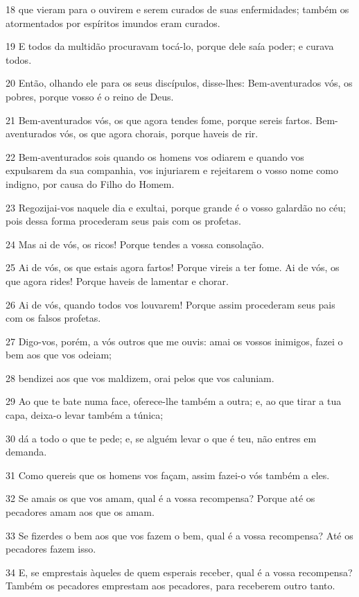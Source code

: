 \par 18 que vieram para o ouvirem e serem curados de suas enfermidades; também os atormentados por espíritos imundos eram curados.
\par 19 E todos da multidão procuravam tocá-lo, porque dele saía poder; e curava todos.
\par 20 Então, olhando ele para os seus discípulos, disse-lhes: Bem-aventurados vós, os pobres, porque vosso é o reino de Deus.
\par 21 Bem-aventurados vós, os que agora tendes fome, porque sereis fartos. Bem-aventurados vós, os que agora chorais, porque haveis de rir.
\par 22 Bem-aventurados sois quando os homens vos odiarem e quando vos expulsarem da sua companhia, vos injuriarem e rejeitarem o vosso nome como indigno, por causa do Filho do Homem.
\par 23 Regozijai-vos naquele dia e exultai, porque grande é o vosso galardão no céu; pois dessa forma procederam seus pais com os profetas.
\par 24 Mas ai de vós, os ricos! Porque tendes a vossa consolação.
\par 25 Ai de vós, os que estais agora fartos! Porque vireis a ter fome. Ai de vós, os que agora rides! Porque haveis de lamentar e chorar.
\par 26 Ai de vós, quando todos vos louvarem! Porque assim procederam seus pais com os falsos profetas.
\par 27 Digo-vos, porém, a vós outros que me ouvis: amai os vossos inimigos, fazei o bem aos que vos odeiam;
\par 28 bendizei aos que vos maldizem, orai pelos que vos caluniam.
\par 29 Ao que te bate numa face, oferece-lhe também a outra; e, ao que tirar a tua capa, deixa-o levar também a túnica;
\par 30 dá a todo o que te pede; e, se alguém levar o que é teu, não entres em demanda.
\par 31 Como quereis que os homens vos façam, assim fazei-o vós também a eles.
\par 32 Se amais os que vos amam, qual é a vossa recompensa? Porque até os pecadores amam aos que os amam.
\par 33 Se fizerdes o bem aos que vos fazem o bem, qual é a vossa recompensa? Até os pecadores fazem isso.
\par 34 E, se emprestais àqueles de quem esperais receber, qual é a vossa recompensa? Também os pecadores emprestam aos pecadores, para receberem outro tanto.
